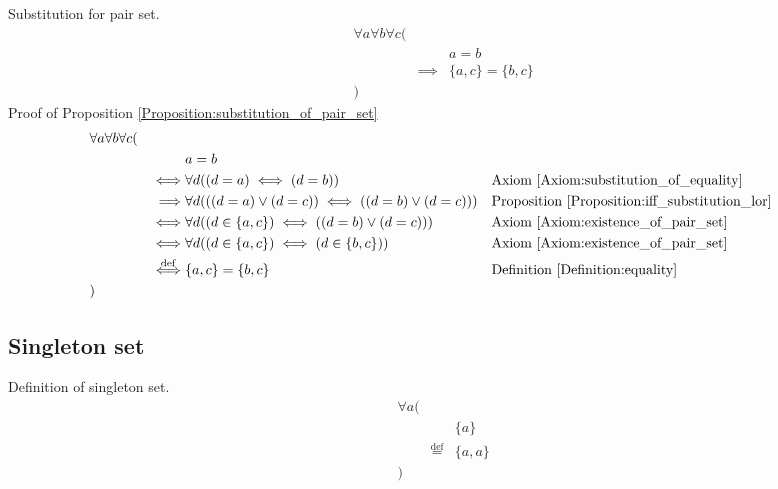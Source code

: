 \begin{prop}
\label{Proposition:substitution_of_pair_set}
Substitution for pair set.
\begin{align*}
& \forall a \forall b \forall c ( \\
& & & a = b \\
& & \implies & \{ a , c \} = \{ b , c \} \\
& )
\end{align*}
Proof of Proposition \ref{Proposition:substitution_of_pair_set}
\begin{align*}
& \forall a \forall b \forall c ( \\
& & & a = b \\
& & \iff & \forall d ((d = a) \iff (d = b))
& & \text{Axiom \ref{Axiom:substitution_of_equality}} \\
& & \implies & \forall d (((d = a) \lor (d = c)) \iff ((d = b) \lor (d = c)))
& & \text{Proposition \ref{Proposition:iff_substitution_lor}} \\
& & \iff & \forall d ((d \in \{ a , c \}) \iff ((d = b) \lor (d = c)))
& & \text{Axiom \ref{Axiom:existence_of_pair_set}} \\
& & \iff & \forall d ((d \in \{ a , c \}) \iff (d \in \{ b , c \}))
& & \text{Axiom \ref{Axiom:existence_of_pair_set}} \\
& & \overset{\operatorname{def}}{\iff} & \{ a , c \} = \{ b , c \}
& & \text{Definition \ref{Definition:equality}} \\
& )
\end{align*}
\end{prop}

\subsection{Singleton set}
\begin{defn}
\label{Definition:singleton_set}
Definition of singleton set.
\begin{align*}
& \forall a ( \\
& & & \{ a \} \\
& & \overset{\operatorname{def}}{=} & \{ a , a \} \\
& )
\end{align*}
\end{defn}

